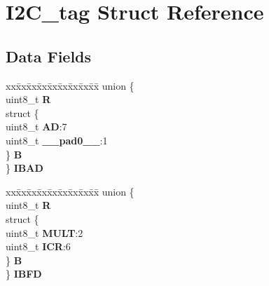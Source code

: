 \hypertarget{structI2C__tag}{}\section{I2\+C\+\_\+tag Struct Reference}
\label{structI2C__tag}
\subsection*{Data Fields}
\begin{DoxyCompactItemize}
\item 
\mbox{\label{structI2C__tag_afaba624af40828e6e88bd89a73351c23}} 
\begin{tabbing}
xx\=xx\=xx\=xx\=xx\=xx\=xx\=xx\=xx\=\kill
union \{\\
\>uint8\_t {\bfseries R}\\
\>struct \{\\
\>\>uint8\_t {\bfseries AD}:7\\
\>\>uint8\_t {\bfseries \_\_pad0\_\_}:1\\
\>\} {\bfseries B}\\
\} {\bfseries IBAD}\\

\end{tabbing}\item 
\mbox{\label{structI2C__tag_aa7855e5877a50e5582ee6efc17717437}} 
\begin{tabbing}
xx\=xx\=xx\=xx\=xx\=xx\=xx\=xx\=xx\=\kill
union \{\\
\>uint8\_t {\bfseries R}\\
\>struct \{\\
\>\>uint8\_t {\bfseries MULT}:2\\
\>\>uint8\_t {\bfseries ICR}:6\\
\>\} {\bfseries B}\\
\} {\bfseries IBFD}\\


\end{tabbing}
\end{DoxyCompactItemize}
